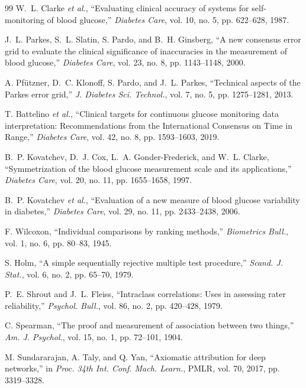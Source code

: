 \documentclass[journal]{IEEEtran}
\begin{document}
\begin{thebibliography}{99}
\label{ref43label} W.~L. Clarke \emph{et al.}, ``Evaluating clinical accuracy of systems for self-monitoring of blood glucose,'' \emph{Diabetes Care}, vol. 10, no. 5, pp. 622--628, 1987.

\label{ref44label} J.~L. Parkes, S.~L. Slatin, S. Pardo, and B.~H. Ginsberg, ``A new consensus error grid to evaluate the clinical significance of inaccuracies in the measurement of blood glucose,'' \emph{Diabetes Care}, vol. 23, no. 8, pp. 1143--1148, 2000.

\label{ref45label} A. Pf\"utzner, D.~C. Klonoff, S. Pardo, and J.~L. Parkes, ``Technical aspects of the Parkes error grid,'' \emph{J. Diabetes Sci. Technol.}, vol. 7, no. 5, pp. 1275--1281, 2013.

\label{ref52label} T. Battelino \emph{et al.}, ``Clinical targets for continuous glucose monitoring data interpretation: Recommendations from the International Consensus on Time in Range,'' \emph{Diabetes Care}, vol. 42, no. 8, pp. 1593--1603, 2019.

\label{ref46label} B.~P. Kovatchev, D.~J. Cox, L.~A. Gonder-Frederick, and W.~L. Clarke, ``Symmetrization of the blood glucose measurement scale and its applications,'' \emph{Diabetes Care}, vol. 20, no. 11, pp. 1655--1658, 1997.

\label{ref47label} B.~P. Kovatchev \emph{et al.}, ``Evaluation of a new measure of blood glucose variability in diabetes,'' \emph{Diabetes Care}, vol. 29, no. 11, pp. 2433--2438, 2006.

\label{ref48label} F. Wilcoxon, ``Individual comparisons by ranking methods,'' \emph{Biometrics Bull.}, vol. 1, no. 6, pp. 80--83, 1945.

\label{ref49label} S. Holm, ``A simple sequentially rejective multiple test procedure,'' \emph{Scand. J. Stat.}, vol. 6, no. 2, pp. 65--70, 1979.

\label{ref50label} P.~E. Shrout and J.~L. Fleiss, ``Intraclass correlations: Uses in assessing rater reliability,'' \emph{Psychol. Bull.}, vol. 86, no. 2, pp. 420--428, 1979.

\label{ref51label} C. Spearman, ``The proof and measurement of association between two things,'' \emph{Am. J. Psychol.}, vol. 15, no. 1, pp. 72--101, 1904.

\label{ref54label} M. Sundararajan, A. Taly, and Q. Yan, ``Axiomatic attribution for deep networks,'' in \emph{Proc. 34th Int. Conf. Mach. Learn.}, PMLR, vol. 70, 2017, pp. 3319--3328.


\end{thebibliography}
\end{document}

